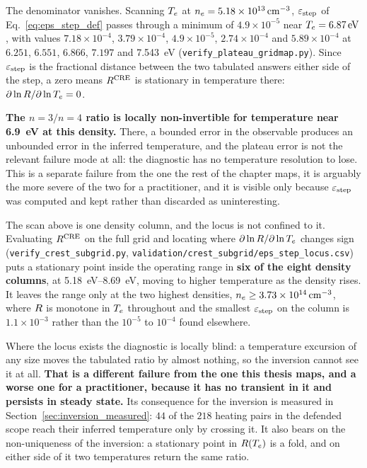 The denominator vanishes. Scanning $T_e$ at
$n_e = \SI{5.18e13}{\per\cubic\centi\metre}$, $\varepsilon_{\mathrm{step}}$ of
Eq.~\eqref{eq:eps_step_def} passes through a minimum of $4.9\times10^{-5}$ near
$T_e = \SI{6.87}{\electronvolt}$, with values $7.18\times10^{-4}$,
$3.79\times10^{-4}$, $4.9\times10^{-5}$, $2.74\times10^{-4}$ and
$5.89\times10^{-4}$ at $6.251$, $6.551$, $6.866$, $7.197$ and
\SI{7.543}{\electronvolt} (\texttt{verify\_plateau\_gridmap.py}). Since
$\varepsilon_{\mathrm{step}}$ is the fractional distance between the two tabulated answers either
side of the step, a zero means $R^{\mathrm{CRE}}$ is stationary in temperature there:
$\partial\ln R/\partial\ln T_e = 0$.

\textbf{The $n=3/n=4$ ratio is locally non-invertible for temperature near
\SI{6.9}{\electronvolt} at this density.} There, a bounded error in the
observable produces an unbounded error in the inferred temperature, and the
plateau error is not the relevant failure mode at all: the diagnostic has no
temperature resolution to lose. This is a separate failure from the one the
rest of the chapter maps, it is arguably the more severe of the two for a
practitioner, and it is visible only because $\varepsilon_{\mathrm{step}}$ was computed and kept
rather than discarded as uninteresting.

The scan above is one density column, and the locus is not confined to it.
Evaluating $R^{\mathrm{CRE}}$ on the full grid and locating where
$\partial\ln R/\partial\ln T_e$ changes sign
(\texttt{verify\_crest\_subgrid.py},
\texttt{validation/crest\_subgrid/eps\_step\_locus.csv}) puts a stationary point
inside the operating range in \textbf{six of the eight density columns}, at
\SIrange{5.18}{8.69}{\electronvolt}, moving to higher temperature as the density
rises. It leaves the range only at the two highest densities,
$n_e \ge \SI{3.73e14}{\per\cubic\centi\metre}$, where $R$ is monotone in
$T_e$ throughout and the smallest $\varepsilon_{\mathrm{step}}$ on the column is
$1.1\times10^{-3}$ rather than the $10^{-5}$ to $10^{-4}$ found elsewhere.

Where the locus exists the diagnostic is locally blind: a temperature excursion
of any size moves the tabulated ratio by almost nothing, so the inversion cannot
see it at all. \textbf{That is a different failure from the one this thesis
maps, and a worse one for a practitioner, because it has no transient in it and
persists in steady state.} Its consequence for the inversion is measured in
Section~\ref{sec:inversion_measured}: $44$ of the $218$ heating pairs in the
defended scope reach their inferred temperature only by crossing it. It also bears on
the non-uniqueness of the inversion: a stationary point in $R(T_e)$ is a
fold, and on either side of it two temperatures return the same ratio.

